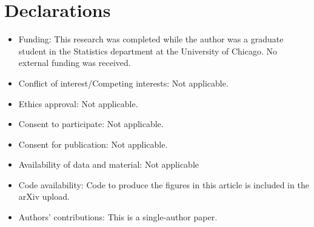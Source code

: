 \documentclass[12pt]{amsart}
\begin{document}
\section*{Declarations}

\begin{itemize}
\item Funding: This research was completed while the author was a graduate student in the Statistics department at the University of Chicago. No external funding was received. 
\item Conflict of interest/Competing interests: Not applicable. 
\item Ethics approval: Not applicable. 
\item Consent to participate: Not applicable. 
\item Consent for publication: Not applicable. 
\item Availability of data and material: Not applicable
\item Code availability: Code to produce the figures in this article is included in the arXiv upload.
\item Authors' contributions: This is a single-author paper. 
\end{itemize}
	
	
	
	
	
\end{document}

